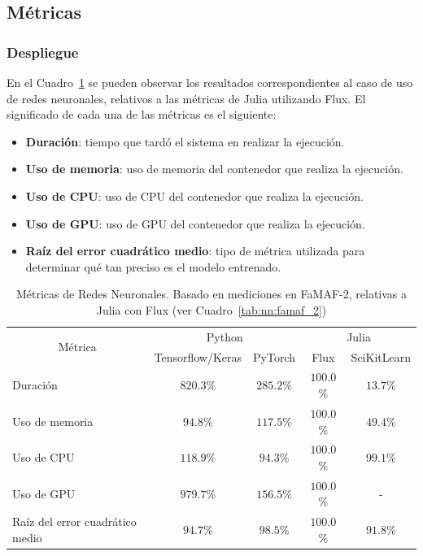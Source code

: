 \documentclass[11pt]{article}
\let\Oldsubsection\subsection
\renewcommand{\subsection}{\FloatBarrier\Oldsubsection}
\let\Oldsubsubsection\subsubsection
\renewcommand{\subsubsection}{\FloatBarrier\Oldsubsubsection}
\begin{document}
\subsection{Métricas}

\subsubsection{Despliegue}

En el Cuadro~\ref{tab:nn:metrics} se pueden observar los resultados correspondientes al caso de uso de redes neuronales, relativos a las métricas de Julia utilizando Flux. El significado de cada una de las métricas es el siguiente:

\begin{itemize}
    \item \textbf{Duración}: tiempo que tardó el sistema en realizar la ejecución.
    \item \textbf{Uso de memoria}: uso de memoria del contenedor que realiza la ejecución.
    \item \textbf{Uso de CPU}: uso de CPU del contenedor que realiza la ejecución.
    \item \textbf{Uso de GPU}: uso de GPU del contenedor que realiza la ejecución.
    \item \textbf{Raíz del error cuadrático medio}: tipo de métrica utilizada para determinar qué tan preciso es el modelo entrenado.
\end{itemize}

\begin{table}[H]
\centering
\begin{tabular}{|l|cc|cc|}
\hline
\multicolumn{1}{|c|}{\multirow{2}{*}{Métrica}} & \multicolumn{2}{c|}{Python} & \multicolumn{2}{c|}{Julia} \\ \cline{2-5} 
\multicolumn{1}{|c|}{} & \multicolumn{1}{c|}{Tensorflow/Keras} & PyTorch & \multicolumn{1}{c|}{Flux} & SciKitLearn \\ \hline
Duración & \multicolumn{1}{c|}{$820.3$\%} & $285.2\%$& \multicolumn{1}{c|}{$100.0$\%} & \multicolumn{1}{c|}{$13.7$\%} \\ \hline
Uso de memoria & \multicolumn{1}{c|}{$94.8$\%} & $117.5\%$& \multicolumn{1}{c|}{$100.0$\%} & \multicolumn{1}{c|}{$49.4$\%} \\ \hline
Uso de CPU & \multicolumn{1}{c|}{$118.9$\%} & $94.3\%$& \multicolumn{1}{c|}{$100.0$\%} & \multicolumn{1}{c|}{$99.1$\%} \\ \hline
Uso de GPU & \multicolumn{1}{c|}{$979.7$\%} & $156.5\%$& \multicolumn{1}{c|}{$100.0$\%} & - \\ \hline
Raíz del error cuadrático medio & \multicolumn{1}{c|}{$94.7$\%} & $98.5\%$& \multicolumn{1}{c|}{$100.0$\%} & \multicolumn{1}{c|}{$91.8$\%} \\ \hline
\end{tabular}
\caption{Métricas de Redes Neuronales. Basado en mediciones en FaMAF-2, relativas a Julia con Flux (ver Cuadro~\ref{tab:nn:famaf_2})}
\label{tab:nn:metrics}
\end{table}
\end{document}

